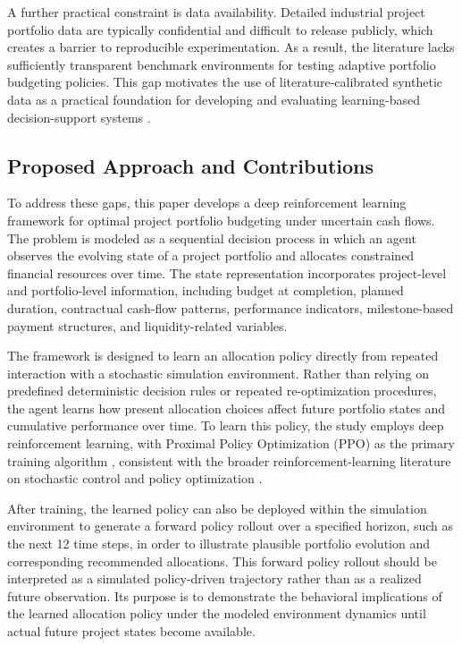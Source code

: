A further practical constraint is data availability. Detailed industrial project portfolio data are typically confidential and difficult to release publicly, which creates a barrier to reproducible experimentation. As a result, the literature lacks sufficiently transparent benchmark environments for testing adaptive portfolio budgeting policies. This gap motivates the use of literature-calibrated synthetic data as a practical foundation for developing and evaluating learning-based decision-support systems \citep{jordon2022synthetic,xu2019modeling}.

\subsection{Proposed Approach and Contributions}

To address these gaps, this paper develops a deep reinforcement learning framework for optimal project portfolio budgeting under uncertain cash flows. The problem is modeled as a sequential decision process in which an agent observes the evolving state of a project portfolio and allocates constrained financial resources over time. The state representation incorporates project-level and portfolio-level information, including budget at completion, planned duration, contractual cash-flow patterns, performance indicators, milestone-based payment structures, and liquidity-related variables.

The framework is designed to learn an allocation policy directly from repeated interaction with a stochastic simulation environment. Rather than relying on predefined deterministic decision rules or repeated re-optimization procedures, the agent learns how present allocation choices affect future portfolio states and cumulative performance over time. To learn this policy, the study employs deep reinforcement learning, with Proximal Policy Optimization (PPO) as the primary training algorithm \citep{schulman2017proximal}, consistent with the broader reinforcement-learning literature on stochastic control and policy optimization \citep{sutton2018reinforcement,haarnoja2018soft}.

After training, the learned policy can also be deployed within the simulation environment to generate a forward policy rollout over a specified horizon, such as the next 12 time steps, in order to illustrate plausible portfolio evolution and corresponding recommended allocations. This forward policy rollout should be interpreted as a simulated policy-driven trajectory rather than as a realized future observation. Its purpose is to demonstrate the behavioral implications of the learned allocation policy under the modeled environment dynamics until actual future project states become available.

